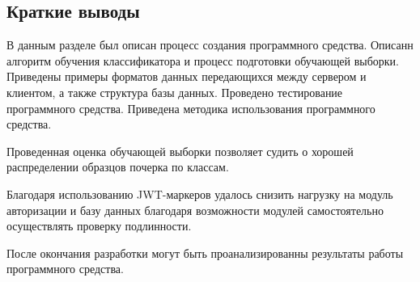 \subsection{Краткие выводы}

В данным разделе был описан процесс создания программного средства. Описанн алгоритм обучения классификатора и процесс подготовки обучающей выборки. Приведены примеры форматов данных передающихся между сервером и клиентом, а также структура базы данных. Проведено тестирование программного средства. Приведена методика использования программного средства. 

Проведенная оценка обучающей выборки позволяет судить о хорошей распределении образцов почерка по классам.

Благодаря использованию JWT-маркеров удалось снизить нагрузку на модуль авторизации и базу данных благодаря возможности модулей самостоятельно осуществлять проверку подлинности.

После окончания разработки могут быть проанализированны результаты работы программного средства.